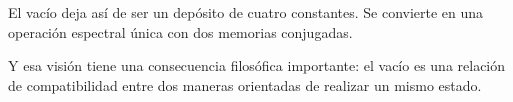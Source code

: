 El vacío deja así de ser un depósito de cuatro constantes. Se convierte en una operación espectral única con dos memorias conjugadas.\par

Y esa visión tiene una consecuencia filosófica importante: el vacío es una relación de compatibilidad entre dos maneras orientadas de realizar un mismo estado.\par

